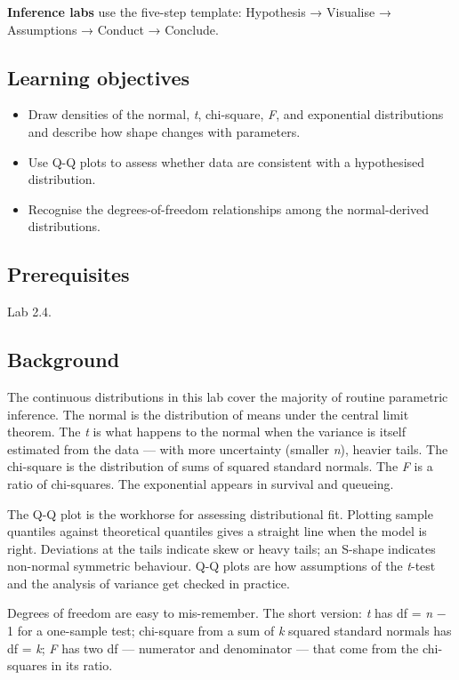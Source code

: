 \documentclass[
]{article}
\author{}
\date{\vspace{-2.5em}}
\providecommand{\tightlist}{%
  \setlength{\itemsep}{0pt}\setlength{\parskip}{0pt}}
\begin{document}
\textbf{Inference labs} use the five-step template: Hypothesis →
Visualise → Assumptions → Conduct → Conclude.

\subsection{Learning objectives}\label{learning-objectives}

\begin{itemize}
\tightlist
\item
  Draw densities of the normal, \emph{t}, chi-square, \emph{F}, and
  exponential distributions and describe how shape changes with
  parameters.
\item
  Use Q-Q plots to assess whether data are consistent with a
  hypothesised distribution.
\item
  Recognise the degrees-of-freedom relationships among the
  normal-derived distributions.
\end{itemize}

\subsection{Prerequisites}\label{prerequisites}

Lab 2.4.

\subsection{Background}\label{background}

The continuous distributions in this lab cover the majority of routine
parametric inference. The normal is the distribution of means under the
central limit theorem. The \emph{t} is what happens to the normal when
the variance is itself estimated from the data --- with more uncertainty
(smaller \emph{n}), heavier tails. The chi-square is the distribution of
sums of squared standard normals. The \emph{F} is a ratio of
chi-squares. The exponential appears in survival and queueing.

The Q-Q plot is the workhorse for assessing distributional fit. Plotting
sample quantiles against theoretical quantiles gives a straight line
when the model is right. Deviations at the tails indicate skew or heavy
tails; an S-shape indicates non-normal symmetric behaviour. Q-Q plots
are how assumptions of the \emph{t}-test and the analysis of variance
get checked in practice.

Degrees of freedom are easy to mis-remember. The short version: \emph{t}
has df = \emph{n} − 1 for a one-sample test; chi-square from a sum of
\emph{k} squared standard normals has df = \emph{k}; \emph{F} has two df
--- numerator and denominator --- that come from the chi-squares in its
ratio.
\end{document}
